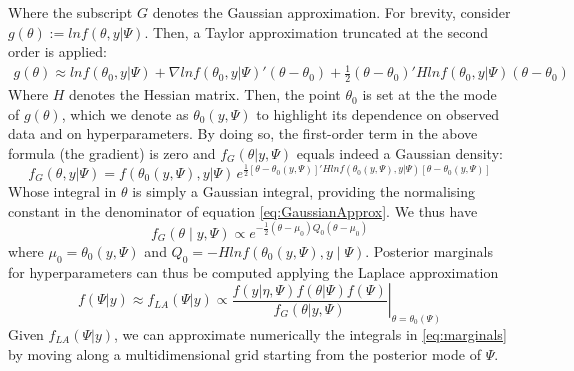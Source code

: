 \documentclass{book}
\begin{document}
Where the subscript $G$ denotes the Gaussian approximation. For brevity, consider $g(\theta) := ln f(\theta, y | \Psi)$. Then, a Taylor approximation truncated at the second order is applied:
\begin{align*}
g(\theta) \approx ln f(\theta_0, y | \Psi) + \nabla lnf(\theta_0, y | \Psi)'(\theta - \theta_0)+ \frac{1}{2}
(\theta - \theta_0)'Hln f(\theta_0, y | \Psi)(\theta - \theta_0)
\end{align*}
Where $H$ denotes the Hessian matrix. Then, the point $\theta_0$ is set at the the mode of $g(\theta)$,  which we denote as $\theta_0(y, \Psi)$ to highlight its dependence on observed data and on hyperparameters. By doing so, the first-order term in the above formula (the gradient) is zero and $f_G(\theta | y, \Psi) $ equals indeed a Gaussian density:
$$
f_{G}(\theta, y | \Psi) =  f(\theta_0(y, \Psi), y | \Psi) \, e^{\displaystyle{
\tfrac{1}{2}[\theta - \theta_0(y, \Psi)]'
Hln f(\theta_0(y, \Psi), y | \Psi)
[\theta - \theta_0(y, \Psi)]
}}
$$
Whose integral in $\theta$ is simply a Gaussian integral, providing the normalising constant in the denominator of equation \ref{eq:GaussianApprox}. We thus have
\begin{equation}
f_G(\theta \mid y, \Psi) \propto e^{\displaystyle - \frac{1}{2}
(\theta - \mu_0)Q_0(\theta - \mu_0)
}
\label{eq:apprG}
\end{equation}
where $\mu_0 = \theta_0(y, \Psi)$ and $Q_0 = -H ln f(\theta_0(y, \Psi), y \mid \Psi)$. 
Posterior marginals for hyperparameters can thus be computed applying the Laplace approximation
$$
f(\Psi |y) \approx f_{LA}(\Psi | y) \propto  \left. \frac{f(y | \eta, \Psi) f(\theta | \Psi) f(\Psi)}{f_G(\theta | y, \Psi)} 
\right \vert_{\theta = \theta_0(\Psi)}
$$
Given $f_{LA} (\Psi | y)$, we can approximate numerically the integrals in \ref{eq:marginals} by moving along a multidimensional grid starting from the posterior mode of $\Psi$.
\end{document}
